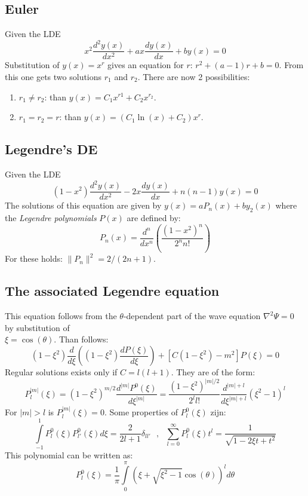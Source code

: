 \documentclass[a4paper,fancyheadings,twoside]{report}
\begin{document}
\subsection{Euler}
Given the LDE
\[
x^2\frac{d^2y(x)}{dx^2}+ax\frac{dy(x)}{dx}+by(x)=0
\]
Substitution of $y(x)=x^r$ gives an equation for $r$: $r^2+(a-1)r+b=0$. From
this one gets two solutions $r_1$ and $r_2$. There are now 2 possibilities:
\begin{enumerate}
\item $r_1\neq r_2$: than $y(x)=C_1x^{r1}+C_2x^{r_2}$.
\item $r_1=r_2=r$: than $y(x)=(C_1\ln(x)+C_2)x^r$.
\end{enumerate}

\subsection{Legendre's DE}
Given the LDE
\[
(1-x^2)\frac{d^2y(x)}{dx^2}-2x\frac{dy(x)}{dx}+n(n-1)y(x)=0
\]
The solutions of this equation are given by $y(x)=aP_n(x)+by_2(x)$
where the {\it Legendre polynomials} $P(x)$ are defined by:
\[
P_n(x)=\frac{d^n}{dx^n}\left(\frac{(1-x^2)^n}{2^n n!}\right)
\]
For these holds: $\|P_n\|^2=2/(2n+1)$.

\subsection{The associated Legendre equation}
This equation follows from the $\theta$-dependent part of the wave equation
$\nabla^2\Psi=0$ by substitution of\\ $\xi=\cos(\theta)$. Than follows:
\[
(1-\xi^2)\frac{d}{d\xi}\left((1-\xi^2)\frac{dP(\xi)}{d\xi}\right)+
[C(1-\xi^2)-m^2]P(\xi)=0
\]
Regular solutions exists only if $C=l(l+1)$. They are of the form:
\[
P_l^{|m|}(\xi)=(1-\xi^2)^{m/2}\frac{d^{|m|}P^0(\xi)}{d\xi^{|m|}}=
\frac{(1-\xi^2)^{|m|/2}}{2^ll!}\frac{d^{|m|+l}}{d\xi^{|m|+l}}(\xi^2-1)^l
\]
For $|m|>l$ is $P_l^{|m|}(\xi)=0$.
Some properties of $P_l^0(\xi)$ zijn:
\[
\int\limits_{-1}^1P_l^0(\xi)P_{l'}^0(\xi)d\xi=\frac{2}{2l+1}\delta_{ll'}~~~,~~~
\sum_{l=0}^\infty P_l^0(\xi)t^l=\frac{1}{\sqrt{1-2\xi t+t^2}}
\]
This polynomial can be written as:
\[
P_l^0(\xi)=\frac{1}{\pi}\int\limits_0^\pi(\xi+\sqrt{\xi^2-1}\cos(\theta))^ld\theta
\]
\end{document}
